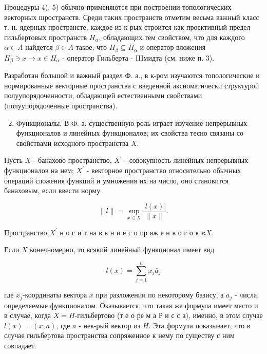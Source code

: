\documentclass[10pt]{article}
\begin{document}
Процедуры 4), 5) обычно применяются при построении топологических векторных шространств. Среди таких пространств отметим весьма важный класс т. н. ядерных пространсте, каждое из к-рых строится как проективный предел гильбертовых пространств $H_{\alpha}$, обладающих тем свойством, что для каждого $\alpha \in A$ найдется $\beta \in A$ такое, что $H_{\beta} \subseteq H_{\alpha}$ и оператор вложения $H_{\beta} \ni x \longrightarrow x \in H_{\alpha}$ - оператор Гильберта - IIIмидта (см. ниже п. 3).



Разработан большой и важный раздел Ф. а., в к-ром изучаются топологические и нормированные векторные пространства с введенной аксиоматически структурой полуупорядоченности, обладающей естественными свойствами (полуупорядоченные пространства).



\begin{enumerate}

  \setcounter{enumi}{1}

  \item Функционалы. В Ф. а. существенную роль играет изучение непрерывных функционалов и линейных функционалов; их свойства тесно связаны со свойствами исходного пространства $X$.

\end{enumerate}



Пусть $X$ - банахово пространство, $X^{\prime}$ - совокупность линейных непрерывных функционалов на нем; $X^{\prime}$ - векторное пространство относительно обычных операций сложения функций и умножения их на число, оно становится банаховым, если ввести норму



\[

\|l\|=\sup _{x \in X} \frac{|l(x)|}{\|x\|} .

\]



Пространство $X^{\prime}$ н о с и т на в в н и е с о пр яж е н в о г о к $\boldsymbol{\kappa} X$.



Если $X$ конечномерно, то всякий линейный функционал имеет вид



\[

l(x)=\sum_{j=1}^{n} x_{j} \bar{a}_{j}

\]



где $x_{j}$-координаты вектора $x$ при разложении по некоторому базису, а $a_{j}$ - числа, определяемые функционалом. Оказывается, что такая же формула имеет место и в случае, когда $X=H$-гильбертово (т е о ре м а Р и с с а), именно, в этом случае $l(x)=(x, a)$, где $a$ - нек-рый вектор из $H$. Эта формула показывает, что в случае гильбертова пространства сопряженное к нему по существу с ним совпадает.
\end{document}
